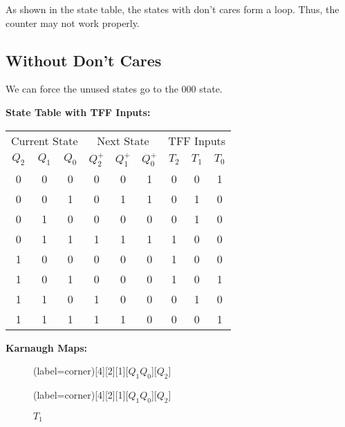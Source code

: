 \documentclass[a4paper,12pt]{article}
\begin{document}
As shown in the state table, the states with don't cares form a loop.
Thus, the counter may not work properly.

\subsection*{Without Don't Cares}

We can force the unused states go to the 000 state.

\textbf{State Table with TFF Inputs:}

\begin{center}
	\begin{tabular}{ccccccccc}
		\toprule
		\multicolumn{3}{c}{Current State} & \multicolumn{3}{c}{Next State} & \multicolumn{3}{c}{TFF Inputs} \\
		\cmidrule(lr){1-3} \cmidrule(lr){4-6} \cmidrule(lr){7-9}
		$Q_2$ & $Q_1$ & $Q_0$ & $Q_2^+$ & $Q_1^+$ & $Q_0^+$ & $T_2$ & $T_1$ & $T_0$ \\
		\midrule
		0 & 0 & 0 & 0 & 0 & 1 & 0 & 0 & 1 \\ 
        0 & 0 & 1 & 0 & 1 & 1 & 0 & 1 & 0 \\ 
        0 & 1 & 0 & 0 & 0 & 0 & 0 & 1 & 0 \\ 
        0 & 1 & 1 & 1 & 1 & 1 & 1 & 0 & 0 \\ 
        1 & 0 & 0 & 0 & 0 & 0 & 1 & 0 & 0 \\ 
        1 & 0 & 1 & 0 & 0 & 0 & 1 & 0 & 1 \\ 
        1 & 1 & 0 & 1 & 0 & 0 & 0 & 1 & 0 \\ 
        1 & 1 & 1 & 1 & 1 & 0 & 0 & 0 & 1 \\ 
		\bottomrule
	\end{tabular}
\end{center}

\textbf{Karnaugh Maps:}

\begin{figure}[H]
	\begin{minipage}{0.5\linewidth}
		\centering
		\begin{karnaugh-map}(label=corner)[4][2][1][$Q_1Q_0$][$Q_2$]
		\end{karnaugh-map}
		\caption*{$T_2$}
	\end{minipage}
	\begin{minipage}{0.5\linewidth}
		\centering
		\begin{karnaugh-map}(label=corner)[4][2][1][$Q_1Q_0$][$Q_2$]
		\end{karnaugh-map}
		\caption*{$T_1$}
	\end{minipage}
\end{figure}
\end{document}
